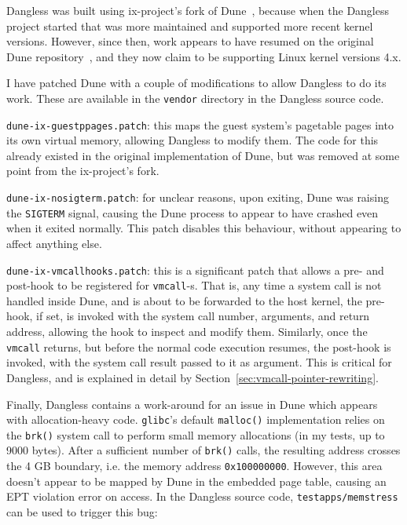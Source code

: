 Dangless was built using ix-project's fork of Dune~\cite{dune-github-ix}, because when the Dangless project started that was more maintained and supported more recent kernel versions. However, since then, work appears to have resumed on the original Dune repository~\cite{dune-github-original}, and they now claim to be supporting Linux kernel versions 4.x.

I have patched Dune with a couple of modifications to allow Dangless to do its work. These are available in the \texttt{vendor} directory in the Dangless source code.

\texttt{dune-ix-guestppages.patch}: this maps the guest system's pagetable pages into its own virtual memory, allowing Dangless to modify them. The code for this already existed in the original implementation of Dune, but was removed at some point from the ix-project's fork.
 
\texttt{dune-ix-nosigterm.patch}: for unclear reasons, upon exiting, Dune was raising the \lstinline!SIGTERM! signal, causing the Dune process to appear to have crashed even when it exited normally. This patch disables this behaviour, without appearing to affect anything else.

\texttt{dune-ix-vmcallhooks.patch}: this is a significant patch that allows a pre- and post-hook to be registered for \lstinline!vmcall!-s. That is, any time a system call is not handled inside Dune, and is about to be forwarded to the host kernel, the pre-hook, if set, is invoked with the system call number, arguments, and return address, allowing the hook to inspect and modify them. Similarly, once the \lstinline!vmcall! returns, but before the normal code execution resumes, the post-hook is invoked, with the system call result passed to it as argument. This is critical for Dangless, and is explained in detail by Section~\ref{sec:vmcall-pointer-rewriting}.

Finally, Dangless contains a work-around for an issue in Dune which appears with allocation-heavy code. \texttt{glibc}'s default \lstinline!malloc()! implementation relies on the \lstinline!brk()! system call to perform small memory allocations (in my tests, up to 9000 bytes). After a sufficient number of \lstinline!brk()! calls, the resulting address crosses the 4 GB boundary, i.e. the memory address \texttt{0x100000000}. However, this area doesn't appear to be mapped by Dune in the embedded page table, causing an EPT violation error on access. In the Dangless source code, \texttt{testapps/memstress} can be used to trigger this bug:

